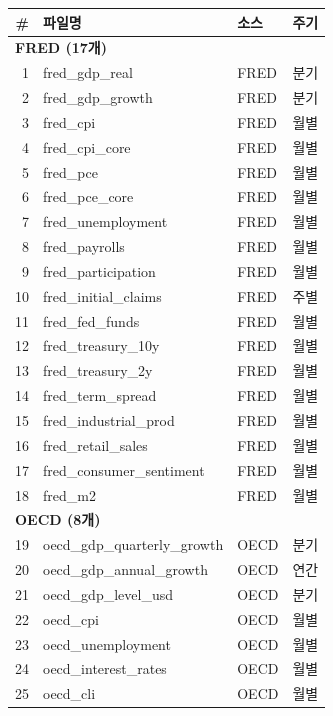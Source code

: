\documentclass[11pt,a4paper]{article}
\begin{document}
\begin{longtable}{r l l l}
\toprule
\textbf{\#} & \textbf{파일명} & \textbf{소스} & \textbf{주기} \\
\midrule
\endhead
\multicolumn{4}{l}{\textbf{FRED (17개)}} \\
\midrule
1  & fred\_gdp\_real              & FRED & 분기 \\
2  & fred\_gdp\_growth            & FRED & 분기 \\
3  & fred\_cpi                    & FRED & 월별 \\
4  & fred\_cpi\_core              & FRED & 월별 \\
5  & fred\_pce                    & FRED & 월별 \\
6  & fred\_pce\_core              & FRED & 월별 \\
7  & fred\_unemployment           & FRED & 월별 \\
8  & fred\_payrolls               & FRED & 월별 \\
9  & fred\_participation          & FRED & 월별 \\
10 & fred\_initial\_claims        & FRED & 주별 \\
11 & fred\_fed\_funds             & FRED & 월별 \\
12 & fred\_treasury\_10y          & FRED & 월별 \\
13 & fred\_treasury\_2y           & FRED & 월별 \\
14 & fred\_term\_spread           & FRED & 월별 \\
15 & fred\_industrial\_prod       & FRED & 월별 \\
16 & fred\_retail\_sales          & FRED & 월별 \\
17 & fred\_consumer\_sentiment    & FRED & 월별 \\
18 & fred\_m2                     & FRED & 월별 \\
\midrule
\multicolumn{4}{l}{\textbf{OECD (8개)}} \\
\midrule
19 & oecd\_gdp\_quarterly\_growth & OECD & 분기 \\
20 & oecd\_gdp\_annual\_growth    & OECD & 연간 \\
21 & oecd\_gdp\_level\_usd        & OECD & 분기 \\
22 & oecd\_cpi                    & OECD & 월별 \\
23 & oecd\_unemployment           & OECD & 월별 \\
24 & oecd\_interest\_rates        & OECD & 월별 \\
25 & oecd\_cli                    & OECD & 월별 \\

\end{longtable}
\end{document}

